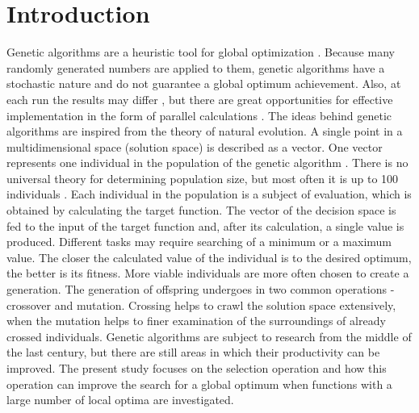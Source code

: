 \documentclass[graybox]{styles/svmult}
\begin{document}

\section{Introduction}
\label{sec:1}

Genetic algorithms are a heuristic tool for global optimization \cite{balabanov-01}. Because many randomly generated numbers are applied to them, genetic algorithms have a stochastic nature and do not guarantee a global optimum achievement. Also, at each run the results may differ \cite{balabanov-02}, but there are great opportunities for effective implementation in the form of parallel calculations \cite{balabanov-03}. The ideas behind genetic algorithms are inspired from the theory of natural evolution. A single point in a multidimensional space (solution space) is described as a vector. One vector represents one individual in the population of the genetic algorithm \cite{balabanov-04}. There is no universal theory for determining population size, but most often it is up to 100 individuals \cite{alander-01}. Each individual in the population is a subject of evaluation, which is obtained by calculating the target function. The vector of the decision space is fed to the input of the target function and, after its calculation, a single value is produced. Different tasks may require searching of a minimum or a maximum value. The closer the calculated value of the individual is to the desired optimum, the better is its fitness. More viable individuals are more often chosen to create a generation. The generation of offspring undergoes in two common operations - crossover and mutation. Crossing helps to crawl the solution space extensively, when the mutation helps to finer examination of the surroundings of already crossed individuals. Genetic algorithms are subject to research from the middle of the last century, but there are still areas in which their productivity can be improved. The present study focuses on the selection operation and how this operation can improve the search for a global optimum when functions with a large number of local optima are investigated.
\end{document}
